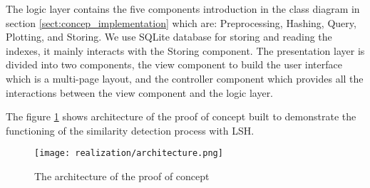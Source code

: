 The logic layer contains the five components introduction in the class diagram
in section \ref{sect:concep_implementation} which are: Preprocessing, Hashing,
Query, Plotting, and Storing. We use SQLite database for storing and reading the
indexes, it mainly interacts with the Storing component. The presentation layer
is divided into two components, the view component to build the user interface
which is a multi-page layout, and the controller component which provides all
the interactions between the view component and the logic layer.

The figure \ref{fig:architecture} shows architecture of the proof of concept
built to demonstrate the functioning of the similarity detection process with
LSH.

\begin{figure}[h]
    \centering
    \texttt{[image: realization/architecture.png]}
    \caption{The architecture of the proof of concept}
    \label{fig:architecture}
\end{figure}